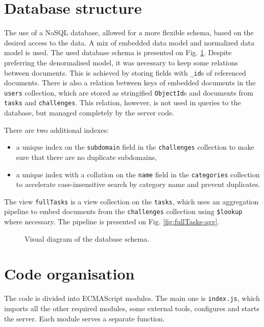 \section{Database structure}

The use of a NoSQL database, allowed for a more flexible schema, based on the desired access to the data. A mix of embedded data model and normalized data model is used. The used database schema is presented on Fig. \ref{fig:db-schema}. Despite preferring the denormalised model, it was necessary to keep some relations between documents. This is achieved by storing fields with \texttt{\_id}s of referenced documents. There is also a relation between keys of embedded documents in the \texttt{users} collection, which are stored as stringified \texttt{ObjectId}s and documents from \texttt{tasks} and \texttt{challenges}. This relation, however, is not used in queries to the database, but managed completely by the server code.

There are two additional indexes:

\begin{itemize}
    \item a unique index on the \texttt{subdomain} field in the \texttt{challenges} collection to make sure that there are no duplicate subdomains,
    \item a unique index with a collation on the \texttt{name} field in the \texttt{categories} collection to accelerate case-insensitive search by category name and prevent duplicates.
\end{itemize}

The view \texttt{fullTasks} is a view collection on the \texttt{tasks}, which uses an aggregation pipeline to embed documents from the \texttt{challenges} collection using \texttt{\$lookup} where necessary. The pipeline is presented on Fig. \ref{fig:fullTasks-agg}.

\begin{figure}
    \centering
    
    \caption{Visual diagram of the database schema.}
    \label{fig:db-schema}
\end{figure}

\section{Code organisation}

The code is divided into ECMAScript modules. The main one is \texttt{index.js}, which imports all the other required modules, some external tools, configures and starts the server. Each module serves a separate function.

